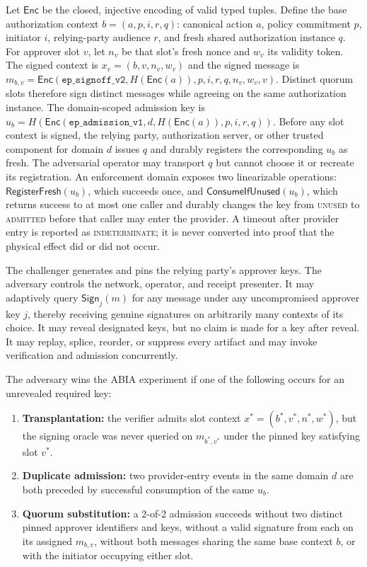 \documentclass[11pt]{article}
\begin{document}
Let $\mathsf{Enc}$ be the closed, injective encoding of valid typed tuples.
Define the base authorization context $b=(a,p,i,r,q)$: canonical action $a$,
policy commitment $p$, initiator $i$, relying-party audience $r$, and fresh
shared authorization instance $q$. For approver slot $v$, let $n_v$ be that
slot's fresh nonce and $w_v$ its validity token. The signed context is
$x_v=(b,v,n_v,w_v)$ and the signed message is
$m_{b,v}=\mathsf{Enc}(\texttt{ep\_signoff\_v2},H(\mathsf{Enc}(a)),p,i,r,q,n_v,w_v,v)$.
Distinct quorum slots therefore sign distinct messages while agreeing on the
same authorization instance. The domain-scoped admission key is
$u_b=H(\mathsf{Enc}(\texttt{ep\_admission\_v1},d,H(\mathsf{Enc}(a)),p,i,r,q))$.
Before any slot context is signed, the relying party, authorization server, or
other trusted component for domain $d$ issues $q$ and durably registers the
corresponding $u_b$ as fresh. The adversarial operator may transport $q$ but
cannot choose it or recreate its registration. An enforcement domain exposes
two linearizable operations: $\mathsf{RegisterFresh}(u_b)$, which succeeds once,
and
$\mathsf{ConsumeIfUnused}(u_b)$, which returns success to at most one caller and
durably changes the key from \textsc{unused} to \textsc{admitted} before that
caller may enter the provider. A timeout after provider entry is reported as
\textsc{indeterminate}; it is never converted into proof that the physical
effect did or did not occur.

The challenger generates and pins the relying party's approver keys. The
adversary controls the network, operator, and receipt presenter. It may
adaptively query $\mathsf{Sign}_j(m)$ for any message under any uncompromised
approver key $j$, thereby receiving genuine signatures on arbitrarily many
contexts of its choice. It may reveal designated keys, but no claim is made for
a key after reveal. It may replay, splice, reorder, or suppress every artifact
and may invoke verification and admission concurrently.

The adversary wins the ABIA experiment if one of the following occurs for an
unrevealed required key:

\begin{enumerate}[leftmargin=*]
\item \textbf{Transplantation:} the verifier admits slot context
$x^*=(b^*,v^*,n^*,w^*)$, but the signing oracle was never queried on $m_{b^*,v^*}$
under the pinned key satisfying slot $v^*$.
\item \textbf{Duplicate admission:} two provider-entry events in the same
domain $d$ are both preceded by successful consumption of the same $u_b$.
\item \textbf{Quorum substitution:} a 2-of-2 admission succeeds without two
distinct pinned approver identifiers and keys, without a valid signature from
each on its assigned $m_{b,v}$, without both messages sharing the same base
context $b$, or with the initiator occupying either slot.
\end{enumerate}
\end{document}

